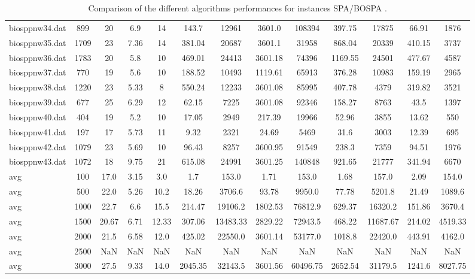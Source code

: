 \begin{table}[!ht]
{\begin{tabular}{lcccccccccccc}
biosppnw34.dat & 899 & 20 & 6.9 & 14 & 143.7 & 12961 & 3601.0 & 108394 & 397.75 & 17875 & 66.91 & 1876 \\
biosppnw35.dat & 1709 & 23 & 7.36 & 14 & 381.04 & 20687 & 3601.1 & 31958 & 868.04 & 20339 & 410.15 & 3737 \\
biosppnw36.dat & 1783 & 20 & 5.8 & 10 & 469.01 & 24413 & 3601.18 & 74396 & 1169.55 & 24501 & 477.67 & 4587 \\
biosppnw37.dat & 770 & 19 & 5.6 & 10 & 188.52 & 10493 & 1119.61 & 65913 & 376.28 & 10983 & 159.19 & 2965 \\
biosppnw38.dat & 1220 & 23 & 5.33 & 8 & 550.24 & 12233 & 3601.08 & 85995 & 407.78 & 4379 & 319.82 & 3521 \\
biosppnw39.dat & 677 & 25 & 6.29 & 12 & 62.15 & 7225 & 3601.08 & 92346 & 158.27 & 8763 & 43.5 & 1397 \\
biosppnw40.dat & 404 & 19 & 5.2 & 10 & 17.05 & 2949 & 217.39 & 19966 & 52.96 & 3855 & 13.62 & 550 \\
biosppnw41.dat & 197 & 17 & 5.73 & 11 & 9.32 & 2321 & 24.69 & 5469 & 31.6 & 3003 & 12.39 & 695 \\
biosppnw42.dat & 1079 & 23 & 5.69 & 10 & 96.43 & 8257 & 3600.95 & 91549 & 238.3 & 7359 & 94.51 & 1976 \\
biosppnw43.dat & 1072 & 18 & 9.75 & 21 & 615.08 & 24991 & 3601.25 & 140848 & 921.65 & 21777 & 341.94 & 6670 \\
\hline avg & 100 & 17.0 &  3.15 & 3.0 &  1.7 & 153.0 &  1.71 & 153.0 &  1.68 & 157.0 &  2.09 & 154.0 \\ \hline
\hline avg & 500 & 22.0 &  5.26 & 10.2 &  18.26 & 3706.6 &  93.78 & 9950.0 &  77.78 & 5201.8 &  21.49 & 1089.6 \\ \hline
\hline avg & 1000 & 22.7 &  6.6 & 15.5 &  214.47 & 19106.2 &  1802.53 & 76812.9 &  629.37 & 16320.2 &  151.86 & 3670.4 \\ \hline
\hline avg & 1500 & 20.67 &  6.71 & 12.33 &  307.06 & 13483.33 &  2829.22 & 72943.5 &  468.22 & 11687.67 &  214.02 & 4519.33 \\ \hline
\hline avg & 2000 & 21.5 &  6.58 & 12.0 &  425.02 & 22550.0 &  3601.14 & 53177.0 &  1018.8 & 22420.0 &  443.91 & 4162.0 \\ \hline
\hline avg & 2500 & NaN &  NaN & NaN &  NaN & NaN &  NaN & NaN &  NaN & NaN &  NaN & NaN \\ \hline
\hline avg & 3000 & 27.5 &  9.33 & 14.0 &  2045.35 & 32143.5 &  3601.56 & 60496.75 &  2652.54 & 31179.5 &  1241.6 & 8027.75 \\ \hline
\bottomrule
\end{tabular}
}%
\caption{Comparison of the different algorithms performances for instances SPA/BOSPA .}
\end{table}
